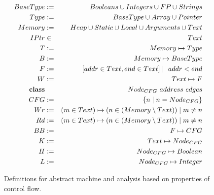 \begin{figure}
\begin{eqnarray}
  BaseType &:=& Booleans \union Integers \union FP
    \union Strings \nonumber\\
  Type &:=& BaseType \union Array \union Pointer \nonumber \\
  Memory &:=& Heap \union Static \union Local
    \union Arguments \union Text \nonumber \\
  IPtr &\in& Text \nonumber\\
  T &:=& Memory \mapsto Type \nonumber \\
  B &:=& Memory \mapsto BaseType \nonumber \\
  F &:=& [ addr \in Text, end \in Text ]  \mid \  addr < end \nonumber\\
  W &:=& Text \mapsto F \nonumber \\
  \textbf{class} && \  Node_{CFG} \  address \  edges \nonumber\\
  \indent CFG &:=& \{ n \mid n = Node_{CFG} \} \nonumber\\
  Wr &:=& (m \in Text) \mapsto (n \in (Memory \setminus Text)) \mid m \neq n
    \nonumber\\
  Rd &:=& (m \in Text) \mapsto (n \in (Memory \setminus Text)) \mid m \neq n
    \nonumber\\
  BB &:=& F \mapsto CFG \nonumber \\
  K &:=& Text \mapsto Node_{CFG} \nonumber\\
  H &:=& Node_{CFG} \mapsto Boolean \nonumber\\
  L &:=& Node_{CFG} \mapsto Integer \nonumber
\end{eqnarray}
  \caption{Definitions for abstract machine and analysis based on
  properties of control flow.}
  \label{fig:model}
\end{figure}

